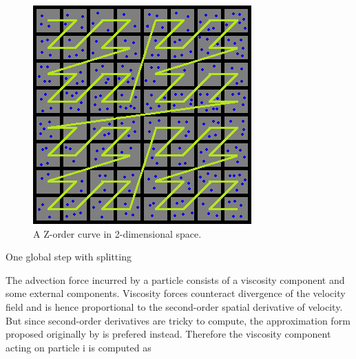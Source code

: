 \documentclass[
	11pt, 
	DIV10,
	ngerman,
	a4paper, 
	oneside, 
	headings=normal, 
	captions=tableheading,
	final, 
	numbers=noenddot
]{scrartcl}
\begin{document}
\begin{figure}[tb]
	\centering
	\includegraphics[scale=0.5]{images/z}
	\caption{\label{fig6} A Z-order curve in 2-dimensional space.}
\end{figure}

\large
\begin{algorithm}
	\DontPrintSemicolon
	\SetAlgoLined
	\SetAlCapNameFnt{\large}
	\SetAlCapFnt{\large}
	\caption{\label{alg1} One global step with splitting \cite{reinhardt2017fully}}
\end{algorithm}
\normalsize

The advection force incurred by a particle consists of a viscosity component and some external components. Viscosity forces counteract divergence of the velocity field and is hence proportional to the second-order spatial derivative of velocity. But since second-order derivatives are tricky to compute, the approximation form proposed originally by \cite{monaghan1992smoothed} is prefered instead. Therefore the viscosity component acting on particle i is computed as
\end{document}
